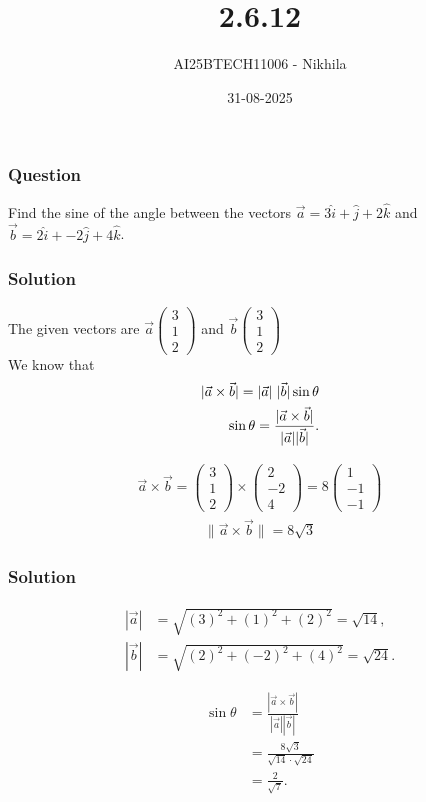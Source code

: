 \documentclass{beamer}
\title{2.6.12 }
\author{AI25BTECH11006 - Nikhila}
\date{31-08-2025}
\begin{document}
\frame{\titlepage}

\begin{frame}
\frametitle{Question}
Find the sine of the angle between the vectors $\vec{a} = 3\hat{i} + \hat{j} + 2\hat{k}$ and $\vec{b} = 2\hat{i} + -2\hat{j} + 4\hat{k}$.\\
 \end{frame}




\begin{frame}
\frametitle{Solution}
The given vectors are $\vec{a}\begin{pmatrix}3 \\ 1 \\ 2\end{pmatrix} $ and $  \vec{b}\begin{pmatrix}3 \\ 1 \\ 2\end{pmatrix}$ \\ 
 We know that 
\begin{align}
|\vec{a}\times\vec{b}| = |\vec{a}| \hspace{0.3em} |\vec{b}| \sin\theta \\
\sin\theta = \frac{|\vec{a}\times\vec{b}|}{|\vec{a}||\vec{b}|}.
\end{align}

\begin{align}
\vec{a} \times \vec{b} = 
\begin{pmatrix}
 3 \\ 1 \\ 2  
\end{pmatrix} \times \begin{pmatrix}
 2 \\ -2 \\ 4  
\end{pmatrix} = 8 \begin{pmatrix} 1 \\ -1 \\ -1 \end{pmatrix}
\end{align}
\begin{align}    
\lVert \vec{a}\times\vec{b} \rVert  =  8\sqrt{3}
\end{align}

\end{frame}


\begin{frame}
\frametitle{Solution}

\begin{align}
|\vec{a}| &= \sqrt{(3)^2 + (1)^2 + (2)^2} = \sqrt{14}, \\
|\vec{b}| &= \sqrt{(2)^2 + (-2)^2 + (4)^2} = \sqrt{24}.
\end{align}

\begin{align}
\sin\theta &= \frac{|\vec{a}\times \vec{b}|}{|\vec{a}||\vec{b}|} \\
&= \frac{8\sqrt{3}}{\sqrt{14}\cdot \sqrt{24}} \\
&= \frac{2}{\sqrt{7}}.
\end{align}

 \end{frame}
\end{document}
